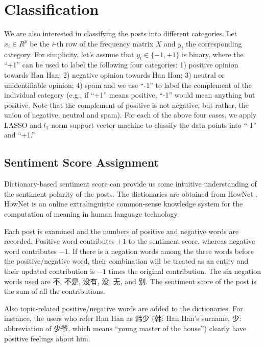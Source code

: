 \documentclass[11pt]{article}
\newcommand{\1}[1]{{\mathbf 1}\left\{#1\right\}}        %
\begin{document}
\section{Classification}
We are also interested in classifying the posts into different categories. Let $x_i\in R^{p}$ be the $i$-th row of the frequency matrix $X$ and $y_i$ the corresponding category. For simplicity, let's assume that $y_i\in\{-1,+1\}$ is binary, where the ``+1'' can be used to label the following four categories: 1) positive opinion towards Han Han; 2) negative opinion towards Han Han; 3) neutral or unidentifiable opinion; 4) spam and we use ``-1'' to label the complement of the individual category (e.g., if ``+1'' means positive, ``-1'' would mean anything but positive. Note that the complement of positive is not negative, but rather, the union of negative, neutral and spam). For each of the above four cases, we apply LASSO and $l_1$-norm support vector machine to classify the data points into ``-1'' and ``+1.''  


\subsection{Sentiment Score Assignment}
Dictionary-based sentiment score can provide us some intuitive understanding of the sentiment polarity of the posts. 
The dictionaries are obtained from HowNet \cite{HowNet}. HowNet is an online extralinguistic common-sense knowledge system for the computation of meaning in human language technology.


Each post is examined and the numbers of positive and negative words are recorded. Positive word contributes $+1$ to the sentiment score, whereas negative word contributes $-1$. If there is a negation words among the three words before the positive/negative word, their combination will be treated as an entity and their updated contribution is $-1$ times the original contribution. The six negation words used are 不, 不是, 没有, 没, 无, and 别. The sentiment score of the post is the sum of all the contributions. 

Also topic-related positive/negative words are added to the dictionaries. For instance, the users who refer Han Han as 韩少 (韩: Han Han's surname, 少: abbreviation of 少爷, which means ``young master of the house'') clearly have positive feelings about him. 

\end{document}
